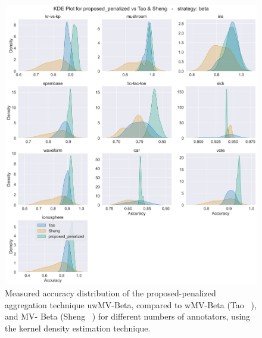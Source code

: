 \documentclass[pdflatex,bst/sn-basic]{bst/sn-jnl}%
\begin{document}
\begin{figure}[!htbp]
    \centering
    \includegraphics[width=\textwidth]{figures/image8.png}
    \caption{{Measured accuracy distribution of the proposed-penalized aggregation technique uwMV-Beta, compared to wMV-Beta (Tao \unskip~\protect\cite{tao_Label_2020}), and MV- Beta (Sheng \unskip~\protect\cite{sheng_Majority_2019}) for different numbers of annotators, using the kernel density estimation technique.}}
    \label{crowd.Fig.6.accuracy}
\end{figure}
\end{document}
